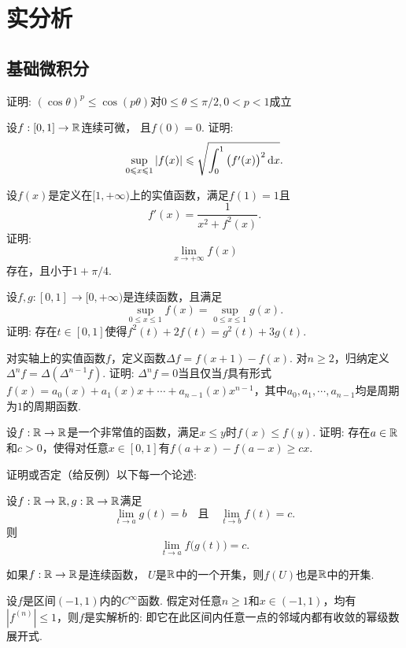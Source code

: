 \chapter{实分析}
\section{基础微积分}
\begin{example}
  证明: $(\cos\theta)^p\le\cos(p\theta)$对$0\le\theta\le\pi/2,0<p<1$成立
\end{example}

\begin{example}
  设$f:[0,1]\to\mathbb R$连续可微， 且$f(0)=0$. 证明:
  \[
    \sup_{0\le x\le1}|f(x)| \le\sqrt{\int_0^1\big(f'(x)\big)^2\,\dx}.
  \]
\end{example}

\begin{example}
  设$f(x)$是定义在$[1,+\infty)$上的实值函数，满足$f(1)=1$且
  \[ f'(x)=\frac1{x^2+f^2(x)}. \]
  证明:
  \[ \lim_{x\to+\infty}f(x) \]
  存在，且小于$1+\pi/4$.
\end{example}

\begin{example}
  设$f,g:[0,1]\to[0,+\infty)$是连续函数，且满足
  \[ \sup_{0\le x\le1}f(x)=\sup_{0\le x\le 1}g(x). \]
  证明: 存在$t\in[0,1]$使得$f^2(t)+2f(t)=g^2(t)+3g(t)$.
\end{example}

\begin{example}
  对实轴上的实值函数$f$，定义函数$\Delta f=f(x+1)-f(x)$. 对$n\ge2$，归纳定义$\Delta^nf=\Delta(\Delta^{n-1}f)$. 证明: $\Delta^nf=0$当且仅当$f$具有形式$f(x)=a_0(x)+a_1(x)x+\cdots+a_{n-1}(x)x^{n-1}$，其中$a_0,a_1,\cdots,a_{n-1}$均是周期为$1$的周期函数.
\end{example}

\begin{example}
  设$f:\mathbb R\to\mathbb R$是一个非常值的函数，满足$x\le y$时$f(x)\le f(y)$. 证明: 存在$a\in\mathbb R$和$c>0$，使得对任意$x\in[0,1]$有$f(a+x)-f(a-x)\ge cx$.
\end{example}

\begin{example}
  证明或否定（给反例）以下每一个论述:
  \begin{eenum}
    \item 设$f:\mathbb R\to\mathbb R,g:\mathbb R\to\mathbb R$满足
    \[\lim_{t\to a}g(t)=b\quad \text{且}\quad \lim_{t\to b}
    f(t)=c.\]
    则
    \[ \lim_{t\to a}f\big(g(t)\big)=c. \]
    \item 如果$f:\mathbb R\to\mathbb R$是连续函数， $U$是$\mathbb R$中的一个开集，则$f(U)$也是$\mathbb R$中的开集.
    \item 设$f$是区间$(-1,1)$内的$C^\infty$函数. 假定对任意$n\ge1$和$x\in(-1,1)$，均有$|f^{(n)}|\le1$，则$f$是实解析的: 即它在此区间内任意一点的邻域内都有收敛的幂级数展开式.
  \end{eenum}
\end{example}

